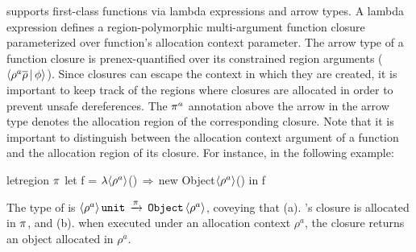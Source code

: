 \fbname supports first-class functions via lambda expressions and
arrow types. A lambda expression defines a region-polymorphic
multi-argument function closure parameterized over function's
allocation context parameter. The arrow type of a function closure is
prenex-quantified over its constrained region arguments
($\langle \rho^a\overline{\rho} \,|\, \phi \rangle$). Since closures can escape the
context in which they are created, it is important to keep track of
the regions where closures are allocated in order to prevent unsafe
dereferences. The $\pi^a$ annotation above the arrow in the arrow
type denotes the allocation region of the corresponding closure. Note
that it is important to distinguish between the allocation context
argument of a function and the allocation region of its closure. For
instance, in the following example:
\begin{codejava}
letregion $\pi$ {
  let f = $\lambda{\langle \rho^a \rangle}$()$\,\Rightarrow\,$new Object$\langle \rho^a \rangle$() 
  in f
}
\end{codejava}
The type of  is $\langle \rho^a \rangle\,{\tt unit}\, \xrightarrow{\pi}
\,{\tt Object}\,\langle \rho^a \rangle$, coveying that (a). 's closure is allocated
in $\pi$, and (b). when executed under an allocation context
$\rho^a$, the closure returns an object allocated in $\rho^a$.

